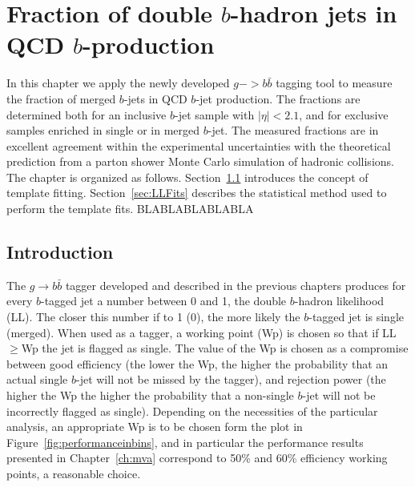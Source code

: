 %
\chapter{Fraction of double $b$-hadron jets in QCD $b$-production}\label{ch:gbbfraction}


In this chapter we apply the newly developed $g->b\bar{b}$ tagging tool to measure the fraction of merged $b$-jets in QCD $b$-jet production. The fractions are determined both for an inclusive $b$-jet sample with $|\eta|<2.1$, and for exclusive samples enriched in single or in merged $b$-jet.
The measured fractions are in excellent agreement within the experimental uncertainties with the theoretical prediction from a parton shower Monte Carlo simulation of hadronic collisions.
The chapter is organized as follows. Section~\ref{sec:FitIntro} introduces the concept of template fitting. Section~\ref{sec:LLFits} describes the statistical method used to perform the template fits.
BLABLABLABLABLA

\section{Introduction}\label{sec:FitIntro}

The $g\rightarrow b\bar{b}$ tagger developed and described in the previous chapters produces for every $b$-tagged jet a number between 0 and 1, the double $b$-hadron likelihood (LL). The closer this number if to 1 (0), the more likely the $b$-tagged jet is single (merged). When used as a tagger, a working point (Wp) is chosen so that if LL$\geq$Wp the jet is flagged as single. The value of the Wp is chosen as a compromise between good efficiency (the lower the Wp, the higher the probability that an actual single $b$-jet will not be missed by the tagger), and rejection power (the higher the Wp the higher the probability that a non-single $b$-jet will not be incorrectly flagged as single). Depending on the necessities of the particular analysis, an appropriate Wp is to be chosen form the plot in Figure~\ref{fig:performanceinbins}, and in particular the performance results presented in Chapter~\ref{ch:mva} correspond to 50\% and 60\% efficiency working points, a reasonable choice.

